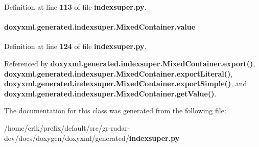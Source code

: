 Definition at line {\bf 113} of file {\bf indexsuper.\+py}.

\paragraph[{value}]{\setlength{\rightskip}{0pt plus 5cm}doxyxml.\+generated.\+indexsuper.\+Mixed\+Container.\+value}\label{classdoxyxml_1_1generated_1_1indexsuper_1_1MixedContainer_a25a1e9c9a909db9651fe8d54eac85a4d}


Definition at line {\bf 124} of file {\bf indexsuper.\+py}.



Referenced by {\bf doxyxml.\+generated.\+indexsuper.\+Mixed\+Container.\+export()}, {\bf doxyxml.\+generated.\+indexsuper.\+Mixed\+Container.\+export\+Literal()}, {\bf doxyxml.\+generated.\+indexsuper.\+Mixed\+Container.\+export\+Simple()}, and {\bf doxyxml.\+generated.\+indexsuper.\+Mixed\+Container.\+get\+Value()}.



The documentation for this class was generated from the following file\+:\begin{DoxyCompactItemize}
\item 
/home/erik/prefix/default/src/gr-\/radar-\/dev/docs/doxygen/doxyxml/generated/{\bf indexsuper.\+py}\end{DoxyCompactItemize}
